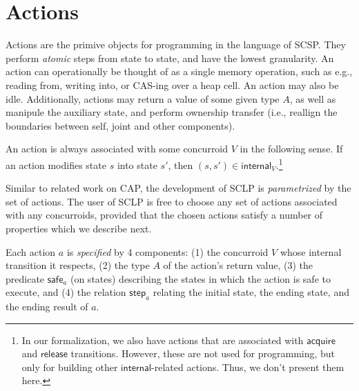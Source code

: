 \section{Actions}\label{sec:actions}

Actions are the primive objects for programming in the language of
SCSP. They perform \emph{atomic} steps from state to state, and have
the lowest granularity. An action can operationally be thought of as a
single memory operation, such as e.g., reading from, writing into, or
CAS-ing over a heap cell. 
%
%
An action may also be idle. Additionally,
actions may return a value of some given type $A$, as well as manipule
the auxiliary state, and perform ownership transfer (i.e., reallign
the boundaries between self, joint and other components).

An action is always associated with some concurroid $V$ in the
following sense. If an action modifies state $s$ into state $s'$, then
$(s, s') \in \mathsf{internal}_V$.\footnote{In our formalization, we
  also have actions that are associated with $\mathsf{acquire}$ and
  $\mathsf{release}$ transitions. However, these are not used for
  programming, but only for building other $\mathsf{internal}$-related
  actions. Thus, we don't present them here.}  


Similar to related work on CAP, the development of SCLP is
\emph{parametrized} by the set of actions. The user of SCLP is free to
choose any set of actions associated with any concurroids, provided
that the chosen actions satisfy a number of properties which we
describe next.

Each action $a$ is \emph{specified} by 4 components: (1) the
concurroid $V$ whose internal transition it respects, (2) the type $A$
of the action's return value, (3) the predicate $\mathsf{safe}_a$ (on
states) describing the states in which the action is safe to execute,
and (4) the relation $\mathsf{step}_a$ relating the initial state, the
ending state, and the ending result of $a$.

